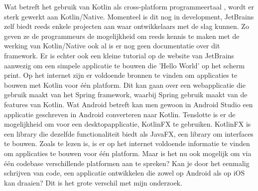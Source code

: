 	\newline
	\newline
	Wat betreft het gebruik van Kotlin als cross-platform programmeertaal \autocite{dzone}, wordt er sterk gewerkt aan Kotlin/Native. Momenteel is dit nog in development, JetBrains zelf biedt reeds enkele projecten aan waar ontwikkelaars met de slag kunnen. Zo geven ze de programmeurs de mogelijkheid om reeds kennis te maken met de werking van Kotlin/Native ook al is er nog geen documentatie over dit framework. Er is echter ook een kleine tutorial op de website van JetBrains aanwezig om een simpele applicatie te bouwen die 'Hello World' op het scherm print.
	\newline
	\newline
	Op het internet zijn er voldoende bronnen te vinden om applicaties te bouwen met Kotlin voor één platform. Dit kan gaan over een webapplicatie die gebruik maakt van het Spring framework, waarbij Spring gebruik maakt van de features van Kotlin. Wat Android betreft kan men gewoon in Android Studio een applicatie geschreven in Android converteren naar Kotlin. Tenslotte is er de mogelijkheid om voor een desktopapplicatie, KotlinFX te gebruiken. KotlinFX is een library die dezelfde functionaliteit biedt als JavaFX, een library om interfaces te bouwen.
	\newline
	\newline
	Zoals te lezen is, is er op het internet voldoende informatie te vinden om applicaties te bouwen voor één platform. Maar is het nu ook mogelijk om via één codebase verschillende platformen aan te spreken? Kan je door het eenmalig schrijven van code, een applicatie ontwikkelen die zowel op Android als op iOS kan draaien? Dit is het grote verschil met mijn onderzoek.
	
	
	
